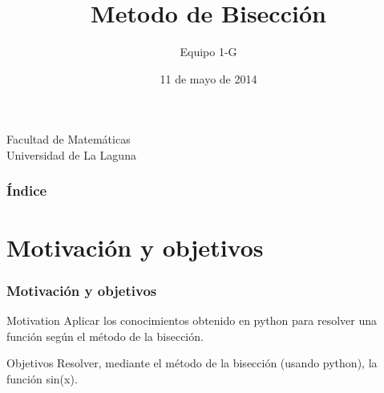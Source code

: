 \documentclass{beamer}
\title[Método de Bisección]{Metodo de Bisección}
\author[Equipo 1 G]{Equipo 1-G}
\date[11-05-2014]{11 de mayo de 2014}
\begin{document}
  

\begin{frame}

  \begin{small}
    \begin{center}
     Facultad de Matemáticas \\
     Universidad de La Laguna
    \end{center}
  \end{small}

\end{frame}


\begin{frame}
  \frametitle{Índice}  
  \tableofcontents[pausesections]
\end{frame}


\section{Motivación y objetivos}
\begin{frame}

\frametitle{Motivación y objetivos}
\begin{block}{Motivation}
    Aplicar los conocimientos obtenido en python para resolver una función según el método de la bisección.
\end{block}

\begin{block}{Objetivos}
     Resolver, mediante el método de la bisección (usando python), la función sin(x).
\end{block}

\end{frame}
\end{document}
